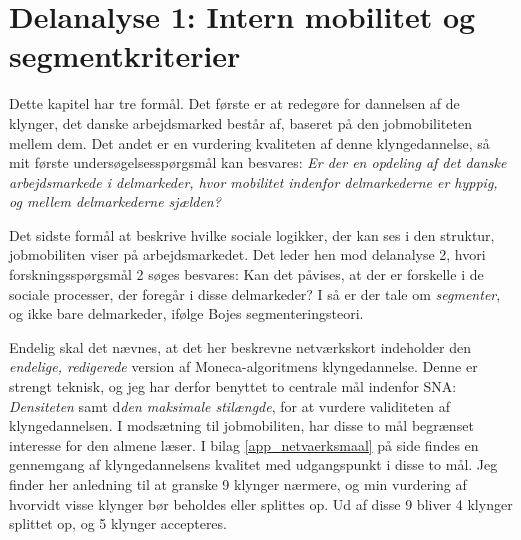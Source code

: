 


\chapter{Delanalyse 1: Intern mobilitet og segmentkriterier\label{kapitel_delanalyse1_deskriptivt}}

Dette kapitel har tre formål. Det første er at redegøre for dannelsen af de klynger, det danske arbejdsmarked består af, baseret på den jobmobiliteten mellem dem. Det andet er en vurdering kvaliteten af denne klyngedannelse, så mit første undersøgelsesspørgsmål kan besvares: \emph{Er der en opdeling af det danske arbejdsmarkede i delmarkeder, hvor mobilitet indenfor delmarkederne er hyppig, og mellem delmarkederne sjælden?}

Det sidste formål at beskrive hvilke sociale logikker, der kan ses i den struktur, jobmobiliten viser på arbejdsmarkedet. Det leder hen mod delanalyse 2, hvori forskningsspørgsmål 2 søges besvares: Kan det påvises, at der er forskelle i de sociale processer, der foregår i disse delmarkeder? I så er der tale om \emph{segmenter}, og ikke bare delmarkeder, ifølge Bojes segmenteringsteori.  

Endelig skal det nævnes, at det her beskrevne netværkskort indeholder den \emph{endelige, redigerede} version af Moneca-algoritmens klyngedannelse. Denne er strengt teknisk, og jeg har derfor benyttet to centrale mål indenfor SNA: \emph{Densiteten} samt d\emph{den maksimale stilængde}, for at vurdere validiteten af klyngedannelsen. I modsætning til jobmobiliten, har disse to mål begrænset interesse for den almene læser. I bilag \ref{app_netvaerksmaal} på side \pageref{app_netvaerksmaal} findes en gennemgang af klyngedannelsens kvalitet med udgangspunkt i disse to mål. Jeg finder her anledning til at granske 9 klynger nærmere, og min vurdering af hvorvidt visse klynger bør beholdes eller splittes op. Ud af disse 9 bliver 4 klynger splittet op, og 5 klynger accepteres. 





	
